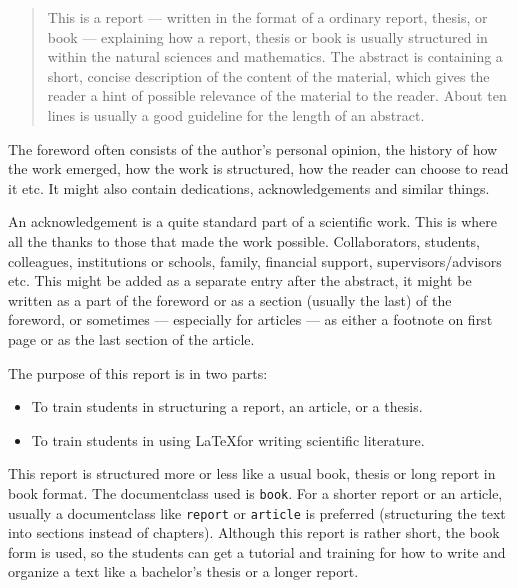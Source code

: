 



\begin{abstract}
This is a report --- written in the format of a ordinary report, thesis, or book --- explaining how a report, thesis or book is usually structured in within the natural sciences and mathematics. 
The abstract is containing a short, concise description of the content of the material, which gives the reader a hint of possible relevance of the material to the reader. About ten lines is usually a good guideline for the length of an abstract.
\end{abstract}



The foreword often consists of the author's personal opinion, the history of how the work emerged, how the work is structured, how the reader can choose to read it etc. It might also contain dedications, acknowledgements and similar things. 


An acknowledgement is a quite standard part of a scientific work. This is where all the thanks to those that made the work possible. Collaborators, students, colleagues, institutions or schools, family, financial support, supervisors/advisors etc. This might be added as a separate entry after the abstract, it might be written as a part of the foreword or as a section (usually the last) of the foreword, or sometimes --- especially for articles --- as either a footnote on first page or as the last section of the article. 


The purpose of this report is in two parts:
\begin{itemize}
\item To train students in structuring a report, an article, or a thesis.
\item To train students in using \LaTeX for writing scientific literature. 
\end{itemize}
This report is structured more or less like a usual book, thesis or long report in book format. The documentclass used is \texttt{book}. For a shorter report or an article, usually a documentclass like \texttt{report} or \texttt{article} is preferred (structuring the text into sections instead of chapters). 
Although this report is rather short, the book form is used, so the students can get a tutorial and training for how to write and organize a text like a bachelor's thesis or a longer report.  

